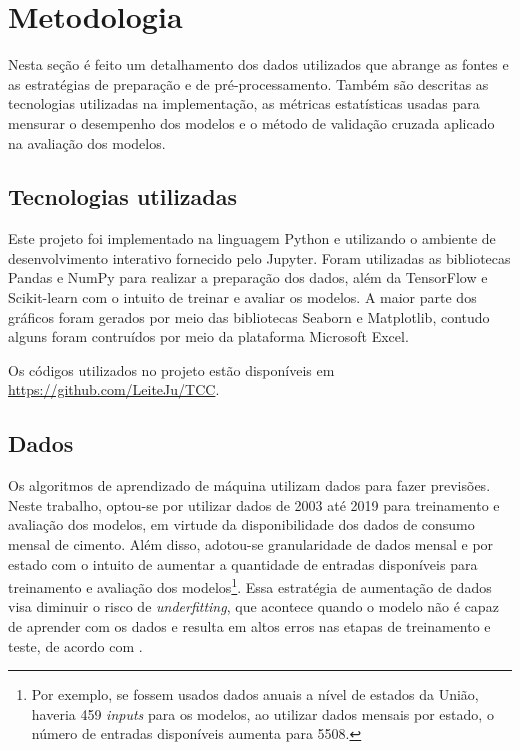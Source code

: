 
\chapter{Metodologia}



Nesta seção é feito um detalhamento dos dados utilizados que 
abrange as fontes e as estratégias de preparação e de pré-processamento. 
Também são descritas as 
tecnologias utilizadas na implementação, as métricas estatísticas 
usadas para mensurar o desempenho dos modelos e o método de validação
cruzada aplicado na avaliação dos modelos.

\section{Tecnologias utilizadas}

Este projeto foi implementado na linguagem Python e 
utilizando o ambiente de desenvolvimento interativo fornecido pelo Jupyter.
Foram utilizadas as bibliotecas Pandas e NumPy para realizar a preparação dos dados,
além da TensorFlow e Scikit-learn com o intuito de treinar e avaliar os modelos.
A maior parte dos gráficos foram gerados por meio das bibliotecas 
Seaborn e Matplotlib, contudo alguns foram contruídos por meio da plataforma
Microsoft Excel.

Os códigos utilizados no projeto estão disponíveis em \url{https://github.com/LeiteJu/TCC}.

\section{Dados}
\label{sec:dados}

Os algoritmos de aprendizado de máquina utilizam dados para fazer 
previsões. 
Neste trabalho, optou-se por utilizar dados de 2003 até 2019 para treinamento e 
avaliação dos modelos, em virtude da disponibilidade dos dados de consumo mensal 
de cimento. Além disso,
adotou-se granularidade de dados
mensal e por estado com o intuito de aumentar a quantidade de entradas disponíveis 
para treinamento e avaliação dos modelos\footnote{Por exemplo, se fossem usados dados 
anuais a nível de estados da União, haveria 459 \textit{inputs} para os modelos, ao 
utilizar dados mensais por estado, o número de entradas disponíveis aumenta para 5508.}.
Essa estratégia de aumentação de dados visa diminuir o risco de  
\textit{underfitting}, que acontece quando o 
modelo não é capaz de aprender com os dados e resulta em altos erros nas etapas de
treinamento e teste, de acordo com \citet{Goodfellow-et-al-2016}.


